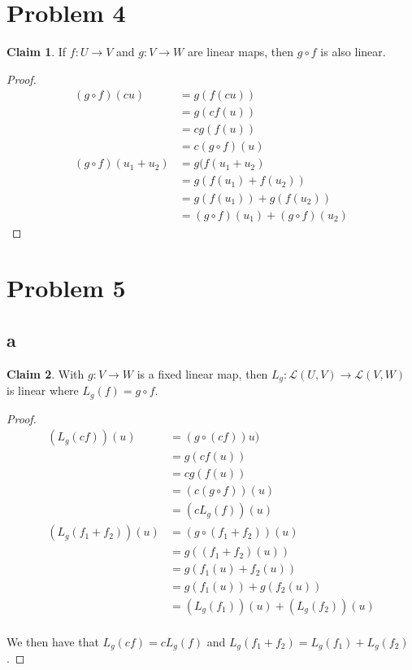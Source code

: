 \documentclass[12pt,letterpaper]{article}
\theoremstyle{definition}
\newtheorem*{claim}{Claim}
\begin{document}
\section*{Problem 4}

\begin{claim}
  If $f: U \rightarrow V$ and $g: V \rightarrow W$ are linear maps, then $g
  \circ f$ is also linear.
\end{claim}

\begin{proof}
  \begin{align*}
    (g \circ f)(cu) &= g(f(cu)) \\
                     &= g(cf(u)) \\
                     &= cg(f(u)) \\
                     &= c(g \circ f)(u) \\
    (g \circ f)(u_1 + u_2) &= g(f(u_1 + u_2) \\
                    &= g(f(u_1) + f(u_2)) \\
                    &= g(f(u_1)) + g(f(u_2)) \\
                    &= (g \circ f)(u_1) + (g \circ f)(u_2)
  \end{align*}
\end{proof}

\section*{Problem 5}

\subsection*{a}

\begin{claim}
  With $g: V \rightarrow W$ is a fixed linear map, then $L_g: \mathcal{L}(U, V)
  \rightarrow \mathcal{L}(V, W)$ is linear where $L_g(f) = g \circ f$.
\end{claim}

\begin{proof}
  \begin{align*}
    (L_g(cf))(u) &= (g \circ (cf))u) \\
                 &= g(cf(u)) \\
                 &= cg(f(u)) \\
                 &= (c(g \circ f))(u) \\
                 &= (cL_g(f))(u) \\
    (L_g(f_1 + f_2))(u) &= (g \circ (f_1 + f_2))(u) \\
                 &= g((f_1 + f_2)(u)) \\
                 &= g(f_1(u) + f_2(u)) \\
                 &= g(f_1(u)) + g(f_2(u)) \\
                 &= (L_g(f_1))(u) + (L_g(f_2))(u) \\
  \end{align*}

  We then have that $L_g(cf) = cL_g(f)$ and $L_g(f_1 + f_2) = L_g(f_1) + L_g(f_2)$.
\end{proof}
\end{document}
